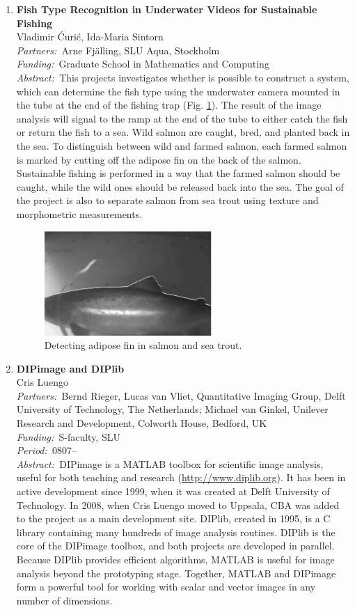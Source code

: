 \documentclass[10pt, a4paper]{article}
\newcommand{\aabstract}[1]{\emph{Abstract:~}#1}
\newcommand{\ffunding}[1]{\emph{Funding:~}#1\\}
\newcommand{\ppartners}[1]{\emph{Partners:~}#1\\}
\newcommand{\pperiod}[1]{\emph{Period:~}#1\\}
\begin{document}
\begin{enumerate}
\newpage
\item
\label{proj:fishslu}
\textbf{Fish Type Recognition in Underwater Videos for Sustainable Fishing}\\
Vladimir \' Curi\' c, Ida-Maria Sintorn\\
\ppartners{Arne Fj\"{a}lling, SLU Aqua, Stockholm}
\ffunding{Graduate School in Mathematics and Computing}
\aabstract{This projects investigates whether is possible to construct a system, which can determine the fish type using the underwater camera mounted in the tube at the end of the fishing trap (Fig. \ref{fig:fishslu}). The result of the image analysis will signal to the ramp at the end of the tube to either catch the fish or return the fish to a sea. Wild salmon are caught, bred, and planted back in the sea. To distinguish between wild and farmed salmon, each farmed salmon is marked by cutting off the adipose fin on the back of the salmon. Sustainable fishing is performed in a way that the farmed salmon should be caught, while the wild ones should be released back into the sea. The goal of the project is also to separate salmon from sea trout using texture and morphometric measurements.}

\begin{figure}[!htbp]
\centering
\includegraphics[width=0.6\textwidth]{figures/research/fritjof.pdf}
\caption{\label{fig:fishslu} Detecting adipose fin in salmon and sea trout.} 
\end{figure}


\item
\label{proj:dipimage}
\textbf{DIPimage and DIPlib}\\
Cris Luengo\\
\ppartners{Bernd Rieger, Lucas van Vliet, Quantitative Imaging Group, Delft University of Technology, The Netherlands; Michael van Ginkel, Unilever Research and Development, Colworth House, Bedford, UK}
\ffunding{S-faculty, SLU}
\pperiod{0807--}
\aabstract{DIPimage is a MATLAB toolbox for scientific image analysis, useful for both teaching and research (\url{http://www.diplib.org}). It has been in active development since 1999, when it was created at Delft University of Technology. In 2008, when Cris Luengo moved to Uppsala, CBA was added to the project as a main development site. DIPlib, created in 1995, is a C library containing many hundreds of image analysis routines. DIPlib is the core of the DIPimage toolbox, and both projects are developed in parallel. Because DIPlib provides efficient algorithms, MATLAB is useful for image analysis beyond the prototyping stage. Together, MATLAB and DIPimage form a powerful tool for working with scalar and vector images in any number of dimensions.

}
\end{enumerate}
\end{document}
